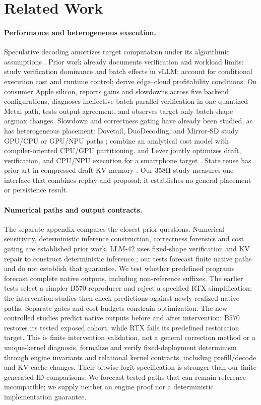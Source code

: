 \section{Related Work}
\label{sec:related}
\paragraph{Performance and heterogeneous execution.}
Speculative decoding amortizes target computation under its algorithmic assumptions \citep{leviathan2023}. Prior work already documents verification and workload limits: \citet{illusion} study verification dominance and batch effects in vLLM; \citet{specllm} account for conditional execution cost and runtime control; \citet{distance} derive edge--cloud profitability conditions. On consumer Apple silicon, \citet{lossless} reports gains and slowdowns across five backend configurations, diagnoses ineffective batch-parallel verification in one quantized Metal path, tests output agreement, and observes target-only batch-shape argmax changes. Slowdown and correctness gating have already been studied, as has heterogeneous placement: Dovetail, DuoDecoding, and Mirror-SD study GPU/CPU or GPU/NPU paths \citep{dovetail,duodecoding,mirror}; \citet{compilerassisted} combine an analytical cost model with compiler-oriented CPU/GPU partitioning, and Lever jointly optimizes draft, verification, and CPU/NPU execution for a smartphone target \citep{lever}. State reuse has prior art in compressed draft KV memory \citep{compactmemory}. Our 358H study measures one interface that combines replay and proposal; it establishes no general placement or persistence result.

\paragraph{Numerical paths and output contracts.}
The separate appendix compares the closest prior questions. Numerical sensitivity, deterministic inference construction, correctness forensics and cost gating are established prior work. LLM-42 uses fixed-shape verification and KV repair to construct deterministic inference \citep{llm42}; our tests forecast finite native paths and do not establish that guarantee. We test whether predefined programs forecast complete native outputs, including non-reference suffixes. The earlier tests select a simpler B570 reproducer and reject a specified RTX simplification; the intervention studies then check predictions against newly realized native paths. Separate gates and cost budgets constrain optimization. The new controlled studies predict native outputs before and after intervention: B570 restores its tested exposed cohort, while RTX fails its predefined restoration target. This is finite intervention validation, not a general correction method or a unique-kernel diagnosis.
\citet{vosti} formalize and verify fixed-deployment determinism through engine invariants and relational kernel contracts, including prefill/decode and KV-cache changes. Their bitwise-logit specification is stronger than our finite generated-ID comparisons. We forecast tested paths that can remain reference-incompatible; we supply neither an engine proof nor a deterministic implementation guarantee.


